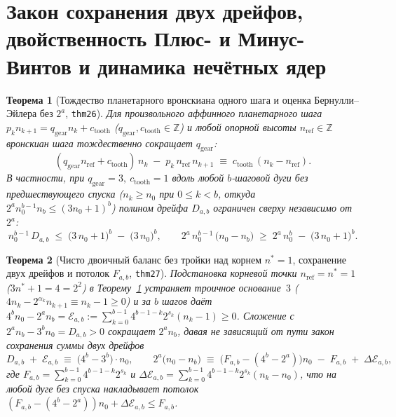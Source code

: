 \documentclass[11pt,a4paper]{article}
\newtheorem{theorem}{Теорема}[section]
\theoremstyle{definition}
\theoremstyle{remark}
\begin{document}
\section{Закон сохранения двух дрейфов, двойственность Плюс- и Минус-Винтов и динамика нечётных ядер}
\label{sec:dual-drift-and-odd-cores}

\begin{theorem}[Тождество планетарного вронскиана одного шага и оценка Бернулли--Эйлера без $2^a$, \texttt{thm26}]
\label{thm:bernoulli-euler-drift-bound}
Для произвольного аффинного планетарного шага $p_k n_{k+1} = q_{\mathrm{gear}} n_k + c_{\mathrm{tooth}}$ ($q_{\mathrm{gear}},c_{\mathrm{tooth}}\in\mathbb{Z}$) и любой опорной высоты $n_{\mathrm{ref}} \in \mathbb{Z}$ вронскиан шага тождественно сокращает $q_{\mathrm{gear}}$:
\[
  (q_{\mathrm{gear}} n_{\mathrm{ref}} + c_{\mathrm{tooth}})\, n_k \;-\; p_k\, n_{\mathrm{ref}}\, n_{k+1} \;\equiv\; c_{\mathrm{tooth}}\,(n_k - n_{\mathrm{ref}}).
\]
В частности, при $q_{\mathrm{gear}}=3,\ c_{\mathrm{tooth}}=1$ вдоль любой $b$-шаговой дуги без предшествующего спуска ($n_k \ge n_0$ при $0 \le k < b$, откуда $2^a n_0^{b-1} n_b \le (3 n_0 + 1)^b$) полином дрейфа $D_{a,b}$ ограничен сверху независимо от $2^a$:
\begin{equation}
  \label{eq:bernoulli-euler-drift-bound}
  n_0^{b-1}\,D_{a,b} \;\le\; \bigl(3\,n_0 + 1\bigr)^b \;-\; \bigl(3\,n_0\bigr)^b, \qquad
  2^a\,n_0^{b-1}\,\bigl(n_0 - n_b\bigr) \;\ge\; 2^a\,n_0^b \;-\; \bigl(3\,n_0 + 1\bigr)^b.
\end{equation}
\end{theorem}

\begin{theorem}[Чисто двоичный баланс без тройки над корнем $n^* = 1$, сохранение двух дрейфов и потолок $F_{a,b}$, \texttt{thm27}]
\label{thm:pure-binary-dual-drift}
Подстановка корневой точки $n_{\mathrm{ref}} = n^* = 1$ ($3 n^* + 1 = 4 = 2^2$) в Теорему~\ref{thm:bernoulli-euler-drift-bound} устраняет троичное основание~$3$ ($4 n_k - 2^{\alpha_k} n_{k+1} \equiv n_k - 1 \ge 0$) и за $b$ шагов даёт $4^b n_0 - 2^a n_b = \mathcal{E}_{a,b} := \sum_{k=0}^{b-1} 4^{b-1-k} 2^{s_k}(n_k - 1) \ge 0$. Сложение с $2^a n_b - 3^b n_0 = D_{a,b} > 0$ сокращает $2^a n_b$, давая не зависящий от пути закон сохранения суммы двух дрейфов
\begin{equation}
  \label{eq:dual-drift-conservation}
  D_{a,b} \;+\; \mathcal{E}_{a,b} \;\equiv\; \bigl(4^b - 3^b\bigr)\cdot n_0, \qquad
  2^a\bigl(n_0 - n_b\bigr) \;\equiv\; \bigl(F_{a,b} - (4^b - 2^a)\bigr) n_0 \;-\; F_{a,b} \;+\; \Delta\mathcal{E}_{a,b},
\end{equation}
где $F_{a,b} = \sum_{k=0}^{b-1} 4^{b-1-k} 2^{s_k}$ и $\Delta\mathcal{E}_{a,b} = \sum_{k=0}^{b-1} 4^{b-1-k} 2^{s_k}(n_k - n_0)$, что на любой дуге без спуска накладывает потолок $(F_{a,b} - (4^b - 2^a)) n_0 + \Delta\mathcal{E}_{a,b} \le F_{a,b}$.
\end{theorem}
\end{document}
